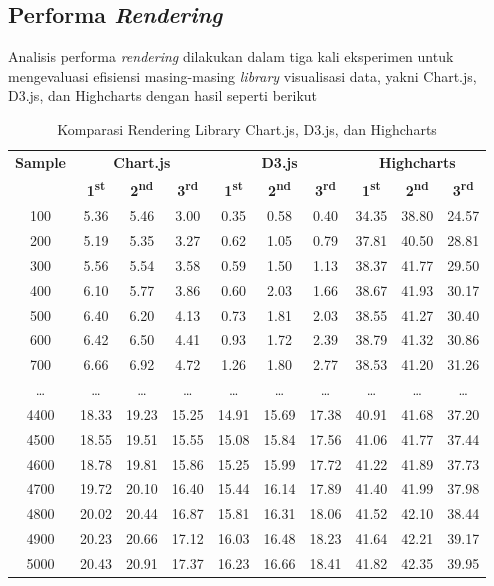 \subsection{Performa \textit{Rendering}}
Analisis performa \textit{rendering} dilakukan dalam tiga kali eksperimen untuk mengevaluasi efisiensi masing-masing \textit{library} visualisasi data, yakni Chart.js, D3.js, dan Highcharts dengan hasil seperti berikut
\begin{table}[H]
	\centering
	\caption{Komparasi Rendering Library Chart.js, D3.js, dan Highcharts}
	\begin{tabular}{|c|ccc|ccc|ccc|}
		\hline
		\textbf{Sample} & \multicolumn{3}{c|}{\textbf{Chart.js}} & \multicolumn{3}{c|}{\textbf{D3.js}} & \multicolumn{3}{c|}{\textbf{Highcharts}} \\
		& \textbf{1\textsuperscript{st}} & \textbf{2\textsuperscript{nd}} & \textbf{3\textsuperscript{rd}} & \textbf{1\textsuperscript{st}} & \textbf{2\textsuperscript{nd}} & \textbf{3\textsuperscript{rd}} & \textbf{1\textsuperscript{st}} & \textbf{2\textsuperscript{nd}} & \textbf{3\textsuperscript{rd}} \\
		\hline
		100  & 5.36 & 5.46 & 3.00 & 0.35 & 0.58 & 0.40 & 34.35 & 38.80 & 24.57 \\
		200  & 5.19 & 5.35 & 3.27 & 0.62 & 1.05 & 0.79 & 37.81 & 40.50 & 28.81 \\
		300  & 5.56 & 5.54 & 3.58 & 0.59 & 1.50 & 1.13 & 38.37 & 41.77 & 29.50 \\
		400  & 6.10 & 5.77 & 3.86 & 0.60 & 2.03 & 1.66 & 38.67 & 41.93 & 30.17 \\
		500  & 6.40 & 6.20 & 4.13 & 0.73 & 1.81 & 2.03 & 38.55 & 41.27 & 30.40 \\
		600  & 6.42 & 6.50 & 4.41 & 0.93 & 1.72 & 2.39 & 38.79 & 41.32 & 30.86 \\
		700  & 6.66 & 6.92 & 4.72 & 1.26 & 1.80 & 2.77 & 38.53 & 41.20 & 31.26 \\
		\ldots & \ldots & \ldots & \ldots & \ldots & \ldots & \ldots & \ldots & \ldots & \ldots \\
		4400 & 18.33 & 19.23 & 15.25 & 14.91 & 15.69 & 17.38 & 40.91 & 41.68 & 37.20 \\
		4500 & 18.55 & 19.51 & 15.55 & 15.08 & 15.84 & 17.56 & 41.06 & 41.77 & 37.44 \\
		4600 & 18.78 & 19.81 & 15.86 & 15.25 & 15.99 & 17.72 & 41.22 & 41.89 & 37.73 \\
		4700 & 19.72 & 20.10 & 16.40 & 15.44 & 16.14 & 17.89 & 41.40 & 41.99 & 37.98 \\
		4800 & 20.02 & 20.44 & 16.87 & 15.81 & 16.31 & 18.06 & 41.52 & 42.10 & 38.44 \\
		4900 & 20.23 & 20.66 & 17.12 & 16.03 & 16.48 & 18.23 & 41.64 & 42.21 & 39.17 \\
		5000 & 20.43 & 20.91 & 17.37 & 16.23 & 16.66 & 18.41 & 41.82 & 42.35 & 39.95 \\
		\hline
	\end{tabular}
\end{table}

